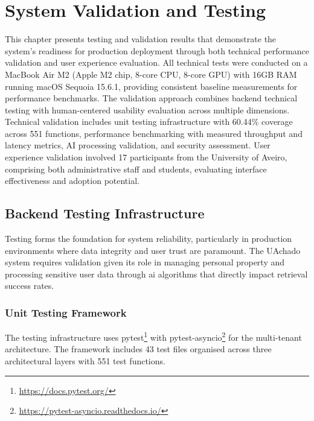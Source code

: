 \chapter{System Validation and Testing}
\label{chapter:testing_validation}

This chapter presents testing and validation results that demonstrate the system's readiness for production deployment through both technical performance validation and user experience evaluation. All technical tests were conducted on a MacBook Air M2 (Apple M2 chip, 8-core CPU, 8-core GPU) with 16GB RAM running macOS Sequoia 15.6.1, providing consistent baseline measurements for performance benchmarks. The validation approach combines backend technical testing with human-centered usability evaluation across multiple dimensions. Technical validation includes unit testing infrastructure with 60.44\% coverage across 551 functions, performance benchmarking with measured throughput and latency metrics, AI processing validation, and security assessment. User experience validation involved 17 participants from the University of Aveiro, comprising both administrative staff and students, evaluating interface effectiveness and adoption potential.


\section{Backend Testing Infrastructure} \label{section:backend_testing}

Testing forms the foundation for system reliability, particularly in production environments where data integrity and user trust are paramount. The UAchado system requires validation given its role in managing personal property and processing sensitive user data through \ac{ai} algorithms that directly impact retrieval success rates.

\subsection{Unit Testing Framework} \label{subsection:unit_testing_framework}

The testing infrastructure uses pytest\footnote{\url{https://docs.pytest.org/}} with pytest-asyncio\footnote{\url{https://pytest-asyncio.readthedocs.io/}} for the multi-tenant architecture. The framework includes 43 test files organised across three architectural layers with 551 test functions.

